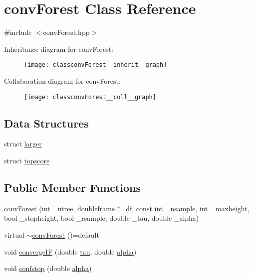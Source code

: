 \hypertarget{classconvForest}{}\section{conv\+Forest Class Reference}
\label{classconvForest}


{\ttfamily \#include $<$conv\+Forest.\+hpp$>$}



Inheritance diagram for conv\+Forest\+:\nopagebreak
\begin{figure}[H]
\begin{center}
\leavevmode
\texttt{[image: classconvForest\_\_inherit\_\_graph]}
\end{center}
\end{figure}


Collaboration diagram for conv\+Forest\+:\nopagebreak
\begin{figure}[H]
\begin{center}
\leavevmode
\texttt{[image: classconvForest\_\_coll\_\_graph]}
\end{center}
\end{figure}
\subsection*{Data Structures}
\begin{DoxyCompactItemize}
\item 
struct \hyperlink{structconvForest_1_1larger}{larger}
\item 
struct \hyperlink{structconvForest_1_1topscore}{topscore}
\end{DoxyCompactItemize}
\subsection*{Public Member Functions}
\begin{DoxyCompactItemize}
\item 
\hyperlink{classconvForest_a03387416058b37c24de2d7a901275695}{conv\+Forest} (int \+\_\+ntree, doubleframe $\ast$\+\_\+df, const int \+\_\+nsample, int \+\_\+maxheight, bool \+\_\+stopheight, bool \+\_\+rsample, double \+\_\+tau, double \+\_\+alpha)
\item 
virtual \hyperlink{classconvForest_a85d5cb4ec991893853acf4be144cdf52}{$\sim$conv\+Forest} ()=default
\item 
void \hyperlink{classconvForest_acf0da12a09b3aa4323c4dc3fe6f1be56}{converge\+IF} (double \hyperlink{classconvForest_a390216111823cd05c48aad3a358a49a7}{tau}, double \hyperlink{classconvForest_a69ed3ccc19fa0439f9fb64ce28c3c66f}{alpha})
\item 
void \hyperlink{classconvForest_a4a20fbcf944458fbbc62400bc0bb2de7}{confstop} (double \hyperlink{classconvForest_a69ed3ccc19fa0439f9fb64ce28c3c66f}{alpha})
\end{DoxyCompactItemize}
